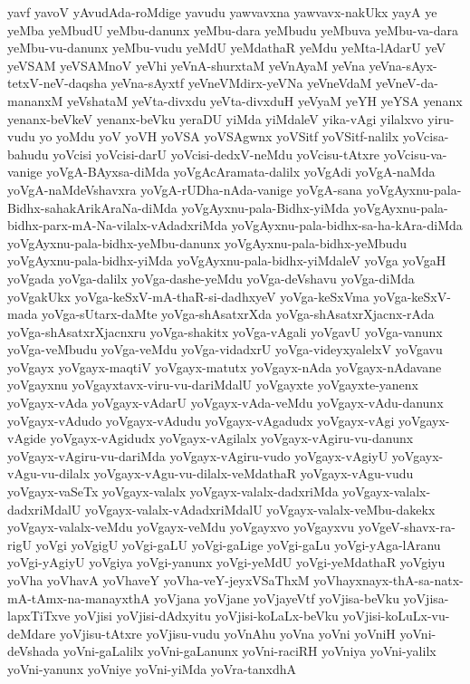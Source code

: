 {yavf
yavoV
yAvudAda-roMdige
yavudu
yawvavxna
yawvavx-nakUkx
yayA
ye
yeMba
yeMbudU
yeMbu-danunx
yeMbu-dara
yeMbudu
yeMbuva
yeMbu-va-dara
yeMbu-vu-danunx
yeMbu-vudu
yeMdU
yeMdathaR
yeMdu
yeMta-lAdarU
yeV
yeVSAM
yeVSAMnoV
yeVhi
yeVnA-shurxtaM
yeVnAyaM
yeVna
yeVna-sAyx-tetxV-neV-daqsha
yeVna-sAyxtf
yeVneVMdirx-yeVNa
yeVneVdaM
yeVneV-da-mananxM
yeVshataM
yeVta-divxdu
yeVta-divxduH
yeVyaM
yeYH
yeYSA
yenanx
yenanx-beVkeV
yenanx-beVku
yeraDU
yiMda
yiMdaleV
yika-vAgi
yilalxvo
yiru-vudu
yo
yoMdu
yoV
yoVH
yoVSA
yoVSAgwnx
yoVSitf
yoVSitf-nalilx
yoVcisa-bahudu
yoVcisi
yoVcisi-darU
yoVcisi-dedxV-neMdu
yoVcisu-tAtxre
yoVcisu-va-vanige
yoVgA-BAyxsa-diMda
yoVgAcAramata-dalilx
yoVgAdi
yoVgA-naMda
yoVgA-naMdeVshavxra
yoVgA-rUDha-nAda-vanige
yoVgA-sana
yoVgAyxnu-pala-Bidhx-sahakArikAraNa-diMda
yoVgAyxnu-pala-Bidhx-yiMda
yoVgAyxnu-pala-bidhx-parx-mA-Na-vilalx-vAdadxriMda
yoVgAyxnu-pala-bidhx-sa-ha-kAra-diMda
yoVgAyxnu-pala-bidhx-yeMbu-danunx
yoVgAyxnu-pala-bidhx-yeMbudu
yoVgAyxnu-pala-bidhx-yiMda
yoVgAyxnu-pala-bidhx-yiMdaleV
yoVga
yoVgaH
yoVgada
yoVga-dalilx
yoVga-dashe-yeMdu
yoVga-deVshavu
yoVga-diMda
yoVgakUkx
yoVga-keSxV-mA-thaR-si-dadhxyeV
yoVga-keSxVma
yoVga-keSxV-mada
yoVga-sUtarx-daMte
yoVga-shAsatxrXda
yoVga-shAsatxrXjacnx-rAda
yoVga-shAsatxrXjacnxru
yoVga-shakitx
yoVga-vAgali
yoVgavU
yoVga-vanunx
yoVga-veMbudu
yoVga-veMdu
yoVga-vidadxrU
yoVga-videyxyalelxV
yoVgavu
yoVgayx
yoVgayx-maqtiV
yoVgayx-matutx
yoVgayx-nAda
yoVgayx-nAdavane
yoVgayxnu
yoVgayxtavx-viru-vu-dariMdalU
yoVgayxte
yoVgayxte-yanenx
yoVgayx-vAda
yoVgayx-vAdarU
yoVgayx-vAda-veMdu
yoVgayx-vAdu-danunx
yoVgayx-vAdudo
yoVgayx-vAdudu
yoVgayx-vAgadudx
yoVgayx-vAgi
yoVgayx-vAgide
yoVgayx-vAgidudx
yoVgayx-vAgilalx
yoVgayx-vAgiru-vu-danunx
yoVgayx-vAgiru-vu-dariMda
yoVgayx-vAgiru-vudo
yoVgayx-vAgiyU
yoVgayx-vAgu-vu-dilalx
yoVgayx-vAgu-vu-dilalx-veMdathaR
yoVgayx-vAgu-vudu
yoVgayx-vaSeTx
yoVgayx-valalx
yoVgayx-valalx-dadxriMda
yoVgayx-valalx-dadxriMdalU
yoVgayx-valalx-vAdadxriMdalU
yoVgayx-valalx-veMbu-dakekx
yoVgayx-valalx-veMdu
yoVgayx-veMdu
yoVgayxvo
yoVgayxvu
yoVgeV-shavx-ra-rigU
yoVgi
yoVgigU
yoVgi-gaLU
yoVgi-gaLige
yoVgi-gaLu
yoVgi-yAga-lAranu
yoVgi-yAgiyU
yoVgiya
yoVgi-yanunx
yoVgi-yeMdU
yoVgi-yeMdathaR
yoVgiyu
yoVha
yoVhavA
yoVhaveY
yoVha-veY-jeyxVSaThxM
yoVhayxnayx-thA-sa-natx-mA-tAmx-na-manayxthA
yoVjana
yoVjane
yoVjayeVtf
yoVjisa-beVku
yoVjisa-lapxTiTxve
yoVjisi
yoVjisi-dAdxyitu
yoVjisi-koLaLx-beVku
yoVjisi-koLuLx-vu-deMdare
yoVjisu-tAtxre
yoVjisu-vudu
yoVnAhu
yoVna
yoVni
yoVniH
yoVni-deVshada
yoVni-gaLalilx
yoVni-gaLanunx
yoVni-raciRH
yoVniya
yoVni-yalilx
yoVni-yanunx
yoVniye
yoVni-yiMda
yoVra-tanxdhA
}
